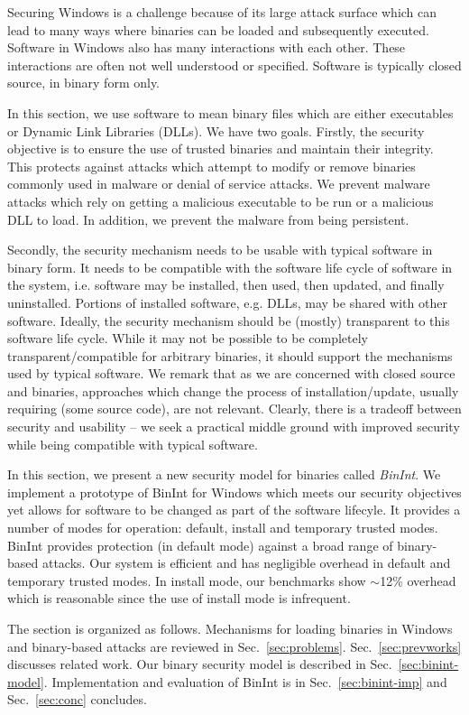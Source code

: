 
Securing Windows is a challenge because of its large
attack surface which can lead to many ways where
binaries can be loaded and subsequently executed.
Software in Windows also has many interactions with each other.
These interactions are often not well understood or specified.
Software is typically closed source, in binary form only.

In this section, we use software to mean binary files which are either
executables or Dynamic Link Libraries (DLLs).
We have two goals. Firstly, the security objective 
is to ensure the use of trusted binaries and maintain their integrity.
This protects against attacks which attempt to modify or remove binaries 
commonly used in malware or denial of service attacks.
We prevent malware attacks which rely on
getting a malicious executable to be run or
a malicious DLL to load.
In addition, we prevent the malware from being persistent.

Secondly, the security mechanism needs to be usable with typical
software in binary form.
It needs to be compatible with the software life cycle of software in the
system, i.e.
software may be installed, then used, then updated, and 
finally uninstalled. 
Portions of installed software, e.g. DLLs,
may be shared with other software. 
Ideally, the security mechanism should be (mostly) transparent to 
this software life cycle.
While it may not be possible to be completely transparent/compatible 
for arbitrary binaries, it should support the mechanisms used 
by typical software.
We remark that as we are concerned with
closed source and binaries,
approaches which change the process of installation/update,
usually requiring (some source code), are not relevant.
Clearly, there is a tradeoff between security and usability --
we seek a practical middle ground with improved security while
being compatible with typical software.

In this section, we present a new security model
for binaries called {\em BinInt}.
We implement a prototype of BinInt for Windows 
which meets our security objectives yet allows
for software to be changed as part of the software lifecyle.
It provides a number of modes for operation: default, install 
and temporary trusted modes.
BinInt provides protection (in default mode) against a broad range of 
binary-based attacks.
Our system is efficient and has negligible overhead in default and temporary
trusted modes. 
In install mode, our benchmarks
show $\sim$12\% overhead which is reasonable since
the use of install mode is infrequent.

The section is organized as follows.
Mechanisms for loading binaries in
Windows and binary-based attacks are reviewed in Sec.~\ref{sec:problems}.
Sec.~\ref{sec:prevworks} discusses related work.
Our binary security model is described in Sec.~\ref{sec:binint-model}.
Implementation and evaluation of BinInt is in
Sec.~\ref{sec:binint-imp} and Sec.~\ref{sec:conc} concludes.

